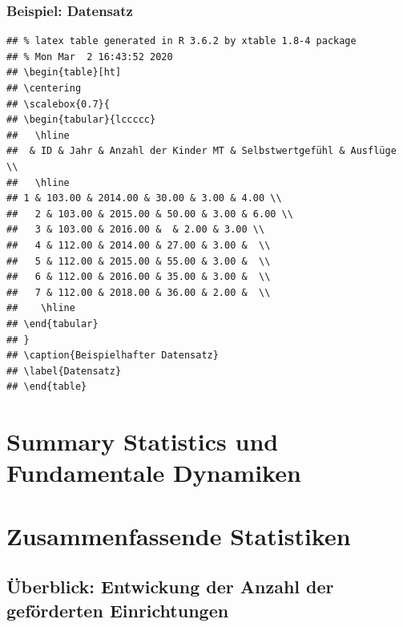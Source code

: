 \begin{frame}[fragile]
\frametitle{Beispiel: Datensatz}
\begin{knitrout}\footnotesize
{}\color{fgcolor}\begin{kframe}
\begin{verbatim}
## % latex table generated in R 3.6.2 by xtable 1.8-4 package
## % Mon Mar  2 16:43:52 2020
## \begin{table}[ht]
## \centering
## \scalebox{0.7}{
## \begin{tabular}{lccccc}
##   \hline
##  & ID & Jahr & Anzahl der Kinder MT & Selbstwertgefühl & Ausflüge \\ 
##   \hline
## 1 & 103.00 & 2014.00 & 30.00 & 3.00 & 4.00 \\ 
##   2 & 103.00 & 2015.00 & 50.00 & 3.00 & 6.00 \\ 
##   3 & 103.00 & 2016.00 &  & 2.00 & 3.00 \\ 
##   4 & 112.00 & 2014.00 & 27.00 & 3.00 &  \\ 
##   5 & 112.00 & 2015.00 & 55.00 & 3.00 &  \\ 
##   6 & 112.00 & 2016.00 & 35.00 & 3.00 &  \\ 
##   7 & 112.00 & 2018.00 & 36.00 & 2.00 &  \\ 
##    \hline
## \end{tabular}
## }
## \caption{Beispielhafter Datensatz} 
## \label{Datensatz}
## \end{table}
\end{verbatim}
\end{kframe}
\end{knitrout}
\end{frame}

\section{Summary Statistics und Fundamentale Dynamiken}


\section{Zusammenfassende Statistiken}

\subsection{Überblick: Entwickung der Anzahl der geförderten Einrichtungen}


